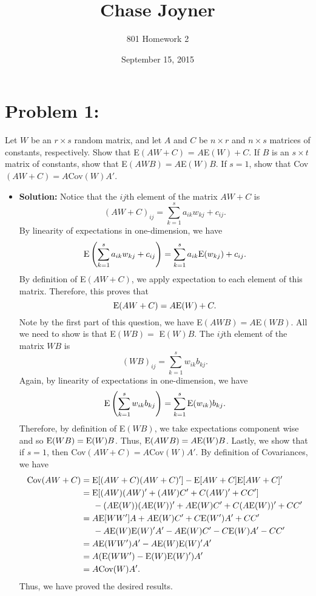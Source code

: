 \documentclass[11pt]{article}
\title{Chase Joyner}
\author{801 Homework 2}
\date{September 15, 2015}
\newcommand{\E}{{\text E}}
\begin{document}
\maketitle
\section*{Problem 1:}
Let $W$ be an $r\times s$ random matrix, and let $A$ and $C$ be $n\times r$ and $n\times s$ matrices of constants, respectively.  Show that E$(AW+C)$ = $A$E$(W)+C$.  If $B$ is an $s\times t$ matrix of constants, show that E$(AWB) = A$E$(W)B$.  If $s=1$, show that Cov$(AW+C) = A$Cov$(W)A'$.
\begin{itemize}
\item[] {\bf Solution:}  Notice that the $ij$th element of the matrix $AW+C$ is
\[
(AW+C)_{ij} = \sum_{k=1}^s a_{ik}w_{kj} + c_{ij}.
\]
By linearity of expectations in one-dimension, we have
\begin{align*}
\E\left(\sum_{k=1}^sa_{ik}w_{kj} + c_{ij}\right) = \sum_{k=1}^sa_{ik}\E(w_{kj}) + c_{ij}.
\end{align*}
By definition of E$(AW+C)$, we apply expectation to each element of this matrix.  Therefore, this proves that
\[
\E(AW+C) = A\E(W) + C.
\]
Note by the first part of this question, we have E$(AWB) = A$E$(WB)$.  All we need to show is that E$(WB) =$ E$(W)B$.  The $ij$th element of the matrix $WB$ is
\[
(WB)_{ij} = \sum_{k=1}^sw_{ik}b_{kj}.
\]
Again, by linearity of expectations in one-dimension, we have
\[
\E\left(\sum_{k=1}^sw_{ik}b_{kj}\right) = \sum_{k=1}^s\E(w_{ik})b_{kj}.
\]
Therefore, by definition of E$(WB)$, we take expectations component wise and so $\E(WB) = \E(W)B$.  Thus, $\E(AWB) = A\E(W)B$.  Lastly, we show that if $s=1$, then Cov$(AW+C) = A$Cov$(W)A'$.  By definition of Covariances, we have
\begin{align*}
\text{Cov}(AW+C) &= \E[(AW+C)(AW+C)'] - \E[AW+C] \E[AW+C]' \\
&= \E[(AW)(AW)' + (AW)C' + C(AW)' + CC']\\
&\hspace{5mm} - (A\E(W))(A\E(W))' + A\E(W)C' + C(A\E(W))' + CC' \\
&= A\E[WW']A + A\E(W)C' + C\E(W')A' + CC'\\
&\hspace{5mm} - A\E(W)\E(W)'A' - A\E(W)C' - C\E(W)A' - CC' \\
&= A\E(WW')A' - A\E(W)\E(W)'A' \\
&= A(\E(WW') - \E(W)\E(W)')A' \\
&= A\text{Cov}(W)A'.
\end{align*}
Thus, we have proved the desired results.
\end{itemize}
\end{document}
